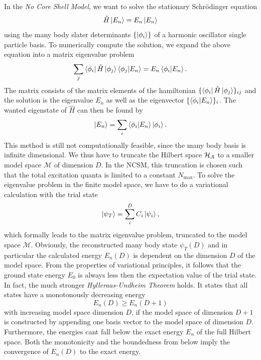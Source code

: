 In the \textit{No Core Shell Model}, we want to solve the stationary Schrödinger equation
\begin{equation}
  \label{eqn:ncsmsgl}
  \hat{H} \ket{E_n} = E_n \ket{E_n}
\end{equation}
using the many body slater determinants $\{\ket{\phi_i}\}$ of a harmonic oscillator single particle basis. To numerically compute the solution, we expand the above equation into a matrix eigenvalue problem
\begin{equation}
  \sum_j \bra{\phi_i}\hat{H}\ket{\phi_j}\braket{\phi_j | E_n} = E_n \braket{\phi_i | E_n}.
\end{equation}
The matrix consists of the matrix elements of the hamiltonian $\{\bra{\phi_i}\hat{H}\ket{\phi_j}\}_{ij}$ and the solution is the eigenvalue $E_n$ as well as the eigenvector $\{\braket{\phi_i|E_n}\}_i$. The wanted eigenstate of $\hat{H}$ can then be found by
\begin{equation}
  \ket{E_n} = \sum_i \braket{\phi_i | E_n} \ket{\phi_i}.
\end{equation}
This method is still not computationally feasible, since the many body basis is infinite dimensional. We thus have to truncate the Hilbert space $\mathcal{H}_A$ to a smaller model space $\mathcal{M}$ of dimension $D$. In the NCSM, this truncation is chosen such that the total excitation quanta is limited to a constant $N_{\mathrm{max}}$.
To solve the eigenvalue problem in the finite model space, we have to do a variational calculation with the trial state
\begin{equation}
  \ket{\psi_T} = \sum_i^{D} C_i \ket{\psi_i},
\end{equation}
which formally leads to the matrix eigenvalue problem, truncated to the model space $\mathcal{M}$. Obviously, the reconstructed many body state $\psi_T(D)$ and in particular the calculated energy $E_n(D)$ is dependent on the dimension $D$ of the model space. From the properties of variational principles, it follows that the ground state energy $E_0$ is always less then the expectation value of the trial state. In fact, the much stronger \textit{Hylleraas-Undheim Theorem} holds. It states that all states have a monotonously decreasing energy
\begin{equation}
  E_n(D) \geq E_n(D+1)
\end{equation}
with increasing model space dimension $D$, if the model space of dimension $D+1$ is constructed by appending one basis vector to the model space of dimension $D$. Furthermore, the energies cant fall below the exact energy $E_n$ of the full Hilbert space. Both the monotonicity and the boundedness from below imply the convergence of $E_n(D)$ to the exact energy.

